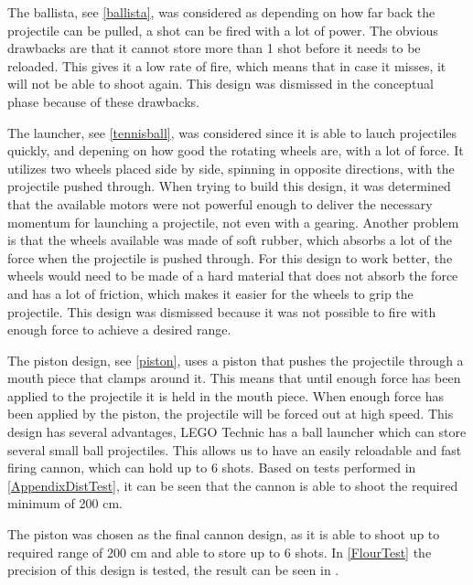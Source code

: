 The ballista, see \autoref{ballista}, was considered as
depending on how far back the projectile can be pulled, a shot can be fired with a lot of power. The obvious drawbacks
are that it cannot store more than 1 shot before it needs to be reloaded. This
gives it a low rate of fire, which means that in case it misses, it will not be
able to shoot again. This design was dismissed in the conceptual phase because
of these drawbacks.\nl

The launcher, see \autoref{tennisball}, was considered since it is able to lauch
projectiles quickly, and depening on how good the rotating wheels are, with a lot of force. It utilizes
two wheels placed side by side, spinning in opposite directions, with the
projectile pushed through. When trying to build this
design, it was determined that the available motors were not powerful enough to
deliver the necessary momentum for launching a projectile, not even with a
gearing. Another problem is that the wheels available was made of soft rubber,
which absorbs a lot of the force when the projectile is pushed through. For
this design to work better, the wheels would need to be made of a hard material
that does not absorb the force and has a lot of friction, which makes it easier
for the wheels to grip the projectile. This design was dismissed because it was
not possible to fire with enough force to achieve a desired range.\nl

The piston design, see \autoref{piston}, uses a piston that pushes the
projectile through a mouth piece that clamps around it. This means that until enough force has been applied to
the projectile it is held in the mouth piece. When enough force has been
applied by the piston, the projectile will be forced out at high speed. This
design has several advantages, LEGO Technic has a ball launcher which can store
several small ball projectiles. This allows us to have an easily reloadable and
fast firing cannon, which can hold up to 6 shots. Based on tests performed in
\autoref{AppendixDistTest}, it can be seen that the cannon is able to shoot the
required minimum of 200 cm.


The piston was chosen as the final cannon design, as it is able to shoot up to
required range of 200 cm and able to store up to 6 shots. In \autoref{FlourTest}
the precision of this design is tested, the result can be seen in
\label{graph:Accuracy}.


